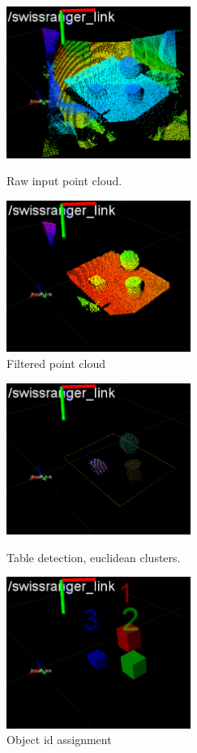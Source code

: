 \documentclass[runningheads,a4paper]{llncs}
\begin{document}
\begin{figure}[ht]
\begin{minipage}[b]{0.5\linewidth}
\centering
\includegraphics[width=60mm]{imgs/0.png}
\caption{Raw input point cloud.}
\label{fig:figure1}
\end{minipage}
\hspace{0.5cm}
\begin{minipage}[b]{0.5\linewidth}
\centering
\includegraphics[width=60mm]{imgs/1.png}
\caption{Filtered point cloud}
\label{fig:filtered_3d_data}
\end{minipage}
\end{figure}

\begin{figure}[ht]
\begin{minipage}[b]{0.5\linewidth}
\centering
\includegraphics[width=60mm]{imgs/2.png}
\caption{Table detection, euclidean clusters.}
\label{fig:clusters}
\end{minipage}
\hspace{0.5cm}
\begin{minipage}[b]{0.5\linewidth}
\centering
\includegraphics[width=60mm]{imgs/4.png}
\caption{Object id assignment}
\label{fig:ids}
\end{minipage}
\end{figure}
\end{document}
